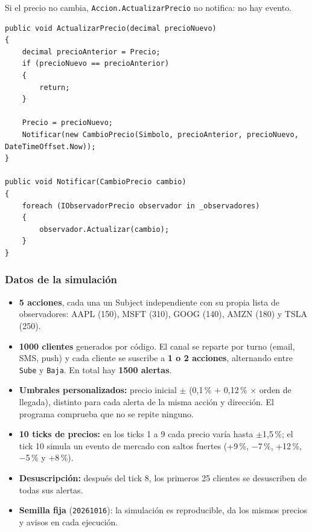 Si el precio no cambia, \texttt{Accion.ActualizarPrecio} no notifica: no hay evento.

\begin{lstlisting}[basicstyle=\ttfamily\footnotesize, columns=fullflexible, keepspaces=true, caption={\texttt{Accion}: el sujeto notifica a todos sus observadores en cada cambio de precio.}]
public void ActualizarPrecio(decimal precioNuevo)
{
    decimal precioAnterior = Precio;
    if (precioNuevo == precioAnterior)
    {
        return;
    }

    Precio = precioNuevo;
    Notificar(new CambioPrecio(Simbolo, precioAnterior, precioNuevo, DateTimeOffset.Now));
}

public void Notificar(CambioPrecio cambio)
{
    foreach (IObservadorPrecio observador in _observadores)
    {
        observador.Actualizar(cambio);
    }
}
\end{lstlisting}

\subsubsection{Datos de la simulación}

\begin{itemize}
  \item \textbf{5 acciones}, cada una un Subject independiente con su propia lista de
        observadores: AAPL (150), MSFT (310), GOOG (140), AMZN (180) y TSLA (250).
  \item \textbf{1000 clientes} generados por código. El canal se reparte por turno (email,
        SMS, push) y cada cliente se suscribe a \textbf{1 o 2 acciones}, alternando entre
        \texttt{Sube} y \texttt{Baja}. En total hay \textbf{1500 alertas}.
  \item \textbf{Umbrales personalizados:} precio inicial $\pm$ (0,1\,\% $+$ 0,12\,\%
        $\times$ orden de llegada), distinto para cada alerta de la misma acción y
        dirección. El programa comprueba que no se repite ninguno.
  \item \textbf{10 ticks de precios:} en los ticks 1 a 9 cada precio varía hasta
        $\pm$1,5\,\%; el tick 10 simula un evento de mercado con saltos fuertes (+9\,\%,
        $-$7\,\%, +12\,\%, $-$5\,\% y +8\,\%).
  \item \textbf{Desuscripción:} después del tick 8, los primeros 25 clientes se desuscriben
        de todas sus alertas.
  \item \textbf{Semilla fija} (\texttt{20261016}): la simulación es reproducible, da los
        mismos precios y avisos en cada ejecución.
\end{itemize}

